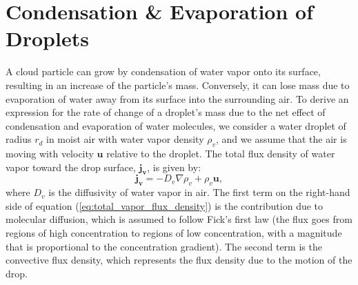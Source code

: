 \documentclass{report}
\begin{document}
\section{Condensation \& Evaporation of Droplets}
\label{sec:condensation_evaporation}
A cloud particle can grow by condensation of water vapor onto its surface, resulting in an increase of the particle's mass. Conversely, it can lose mass due to evaporation of water away from its surface into the surrounding air.
To derive an expression for the rate of change of a droplet's mass due to the net effect of condensation and evaporation of water molecules, we consider a water droplet of radius $r_{d}$ in moist air with water vapor density $\rho_v$, and we assume that the air is moving with velocity $\mathbf{u}$ relative to the droplet. The total flux density of water vapor toward the drop surface, $\mathbf{j_v}$, is given by: 
\begin{equation}
    \mathbf{j_v} = -D_v \nabla \rho_v + \rho_v \mathbf{u},
\label{eq:total_vapor_flux_density}
\end{equation}
where $D_v$ is the diffusivity of water vapor in air. The first term on the right-hand side of equation (\ref{eq:total_vapor_flux_density}) is the contribution due to molecular diffusion, which is assumed to follow Fick's first law (the flux goes from regions of high concentration to regions of low concentration, with a magnitude that is proportional to the concentration gradient). The second term is the convective flux density, which represents the flux density due to the motion of the drop. 
\end{document}
